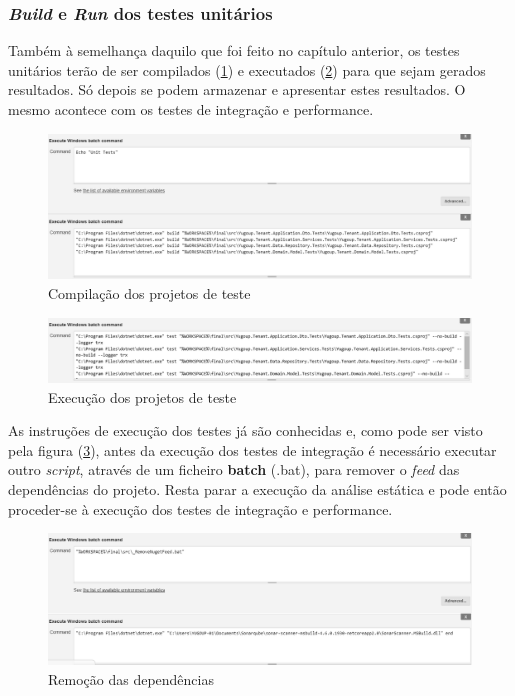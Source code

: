 \subsubsection{\textit{Build} e \textit{Run} dos testes unitários}

\hspace{1cm}Também à semelhança daquilo que foi feito no capítulo anterior, os testes unitários terão de ser compilados (\ref{Fig:Fig66}) e executados (\ref{Fig:Fig67}) para que sejam gerados resultados. Só depois se podem armazenar e apresentar estes resultados. O mesmo acontece com os testes de integração e performance.

\begin{figure}[hbt!]
\centering
\includegraphics[width=0.9\linewidth]{Cap6/TenantUnitTests.png}
\caption{Compilação dos projetos de teste}
\label{Fig:Fig66}
\end{figure}

\begin{figure}[hbt!]
\centering
\includegraphics[width=0.9\linewidth]{Cap6/TenantUnitTestsExecution.png}
\caption{Execução dos projetos de teste}
\label{Fig:Fig67}
\end{figure}

 As instruções de execução dos testes já são conhecidas e, como pode ser visto pela figura (\ref{Fig:Fig68}), antes da execução dos testes de integração é necessário executar outro \textit{script}, através de um ficheiro \textbf{batch} (.bat), para remover o \textit{feed} das dependências do projeto. Resta parar a execução da análise estática e pode então proceder-se à execução dos testes de integração e performance.


\begin{figure}[hbt!]
\centering
\includegraphics[width=0.9\linewidth]{Cap6/TenantRemoveFeed.png}
\caption{Remoção das dependências}
\label{Fig:Fig68}
\end{figure}

